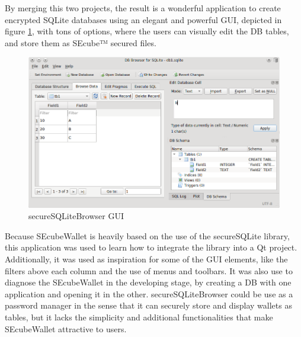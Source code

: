By merging this two projects, the result is a wonderful application to create encrypted SQLite databases using an elegant and powerful GUI, depicted in figure \ref{fig:sqlitebro}, with tons of options, where the users can visually edit the DB tables, and store them as SEcube™ secured files. 

\begin{figure}[htb]
  \centering
  \captionsetup{justification=centering}
  \centerline{\includegraphics[width=1\columnwidth]{chapters/figures/related/sqlitebro.png}}
  \caption{secureSQLiteBrowser GUI}
  \label{fig:sqlitebro}
\end{figure}

Because SEcubeWallet is heavily based on the use of the secureSQLite library, this application was used to learn how to integrate the library into a Qt project. Additionally, it was used as inspiration for some of the GUI elements, like the filters above each column and the use of menus and toolbars. It was also use to diagnose the SEcubeWallet in the developing stage, by creating a DB with one application and opening it in the other. secureSQLiteBrowser could be use as a password manager in the sense that it can securely store and display wallets as tables, but it lacks the simplicity and additional functionalities that make SEcubeWallet attractive to users.